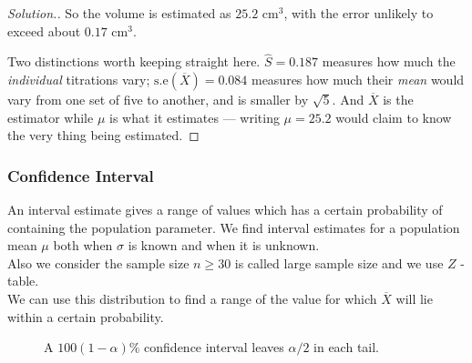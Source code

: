 \documentclass[11pt,a4paper]{article}
\theoremstyle{definition}
\newenvironment{solution}
  {\renewcommand{\qedsymbol}{}\begin{proof}[\textit{Solution}.]}
  {\end{proof}}
\begin{document}
\begin{solution}
So the volume is estimated as $25.2$ cm$^3$, with the error unlikely to exceed about
$0.17$ cm$^3$.

Two distinctions worth keeping straight here. $\hat{S}=0.187$ measures how much the
\emph{individual} titrations vary; $\text{s.e}(\overline{X})=0.084$ measures how much their
\emph{mean} would vary from one set of five to another, and is smaller by $\sqrt{5}$. And
$\overline{X}$ is the estimator while $\mu$ is what it estimates --- writing $\mu=25.2$ would
claim to know the very thing being estimated.
\end{solution}











\subsubsection{Confidence Interval}
An interval estimate gives a range of values which has a certain probability of containing the population parameter. We find interval estimates for a population mean $\mu$ both when $\sigma$ is known and when it is unknown.\\ Also we consider the sample size $n\geq 30$ is called large sample size and we use $Z$ - table.\\ We can use this distribution to find a range of the value for which $\overline{X}$ will lie within a certain probability.




\begin{figure}[H]
\centering
{}
\caption{A $100(1-\alpha)\%$ confidence interval leaves $\alpha/2$ in each tail.}
\end{figure}
\end{document}
